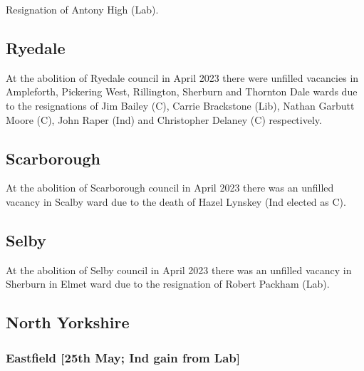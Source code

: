 \documentclass[a4paper,openany]{book}
\begin{document}
\begin{resultsiii}

Resignation of Antony High (Lab).

\subsection*{Ryedale}

At the abolition of Ryedale council in April 2023 there were unfilled vacancies in Ampleforth, Pickering West, Rillington, Sherburn and Thornton Dale wards due to the resignations of Jim Bailey (C), Carrie Brackstone (Lib), Nathan Garbutt Moore (C), John Raper (Ind) and Christopher Delaney (C) respectively.%
%
%
%
%

\subsection*{Scarborough}

At the abolition of Scarborough council in April 2023 there was an unfilled vacancy in Scalby ward due to the death of Hazel Lynskey (Ind elected as C).%

\subsection*{Selby}

At the abolition of Selby council in April 2023 there was an unfilled vacancy in Sherburn in Elmet ward due to the resignation of Robert Packham (Lab).%

\subsection*{North Yorkshire}

\subsubsection*{Eastfield \hspace*{\fill}\nolinebreak[1]%
	\enspace\hspace*{\fill}
	[25th May; Ind gain from Lab]}


\end{resultsiii}
\end{document}
